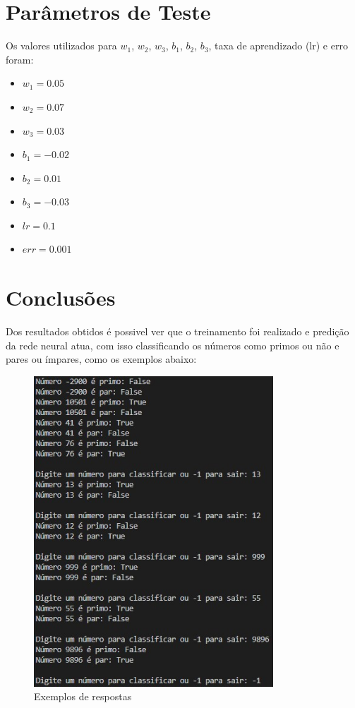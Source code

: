 \documentclass{article}
\begin{document}
\newpage

\section{Parâmetros de Teste}
\begin{flushleft}
Os valores utilizados para $w_1$, $w_2$, $w_3$, $b_1$, $b_2$, $b_3$, taxa de aprendizado (lr) e erro foram:
\end{flushleft}

\begin{itemize}
  \item $w_1 = 0.05$
  \item $w_2 = 0.07$
  \item $w_3 = 0.03$
  \item $b_1 = -0.02$
  \item $b_2 = 0.01$
  \item $b_3 = -0.03$
  \item $lr = 0.1$
  \item $err = 0.001$
\end{itemize}

\newpage
\section{Conclusões}

\begin{flushleft}
Dos resultados obtidos é possivel ver que o treinamento foi realizado e predição da rede neural atua, com isso classificando os números como primos ou não e pares ou ímpares, como os exemplos abaixo:
\end{flushleft}

\newpage

\begin{figure}
    \centering
    \includegraphics[width=0.8\textwidth]{Exemplos_2.jpg}
    \caption{Exemplos de respostas}
    \label{fig:conclusões}
\end{figure}
\end{document}
